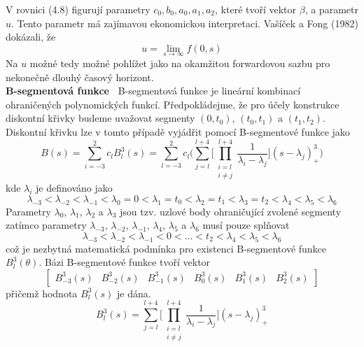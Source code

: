 \documentclass[a4paper]{book}
\begin{document}
V rovnici (4.8) figurují parametry $c_0, b_0, a_0, a_1, a_2$, které tvoří vektor $\beta$, a parametr $u$. Tento parametr má zajímavou ekonomickou interpretaci. Vašíček a Fong (1982) dokázali, že
\begin{equation*}
u = \underset{s \rightarrow \infty}{\lim} f(0,s)
\end{equation*}
Na $u$ možné tedy možné pohlížet jako na okamžitou forwardovou sazbu pro nekonečně dlouhý časový horizont.\\

\noindent \textbf{B-segmentová funkce~} B-segmentová funkce je lineární kombinací ohraničených polynomických funkcí. Předpokládejme, že pro účely konstrukce diskontní křivky budeme uvažovat segmenty $(0, t_0)$, $(t_0, t_1)$ a $(t_1, t_2)$. Diskontní křivku lze v tomto případě vyjádřit pomocí B-segmentové funkce jako
\begin{equation}
B(s) = \sum_{i = -3}^2 c_l B_l^3(s) = \sum_{l = -3}^2 c_l \Bigg( \sum_{j=l}^{l + 4} \Bigg[ \prod_{\substack{i=l \\ i \neq j}}^{l+4} \frac{1}{\lambda_i - \lambda_j}\Bigg](s - \lambda_j)_{+}^3\Bigg)
\end{equation}
kde $\lambda_i$ je definováno jako
\begin{equation*}
\lambda_{-3} < \lambda_{-2} < \lambda_{-1} < \lambda_0 = 0 < \lambda_1 = t_0 < \lambda_2 = t_1 < \lambda_3 = t_2 < \lambda_4 < \lambda_5 < \lambda_6
\end{equation*}
Parametry $\lambda_0$, $\lambda_1$, $\lambda_2$ a $\lambda_3$ jsou tzv. uzlové body ohraničující zvolené segmenty zatímco parametry $\lambda_{-3}$, $\lambda_{-2}$, $\lambda_{-1}$, $\lambda_4$, $\lambda_5$ a $\lambda_6$ musí pouze splňovat
\begin{equation*}
\lambda_{-3} < \lambda_{-2} < \lambda_{-1} < 0 < \dots < t_2 < \lambda_4 < \lambda_5 < \lambda_6
\end{equation*}
což je nezbytná matematická podmínka pro existenci B-segmentové funkce $B_l^3(\theta)$. Bázi B-segmentové funkce tvoří vektor
\begin{equation*}
\begin{bmatrix}
B_{-3}^3(s) & B_{-2}^3(s) & B_{-1}^3(s) & B_{0}^3(s) & B_{1}^3(s) & B_{2}^3(s)
\end{bmatrix}
\end{equation*}
přičemž hodnota $B_l^3(s)$ je dána.
\begin{equation*}
B_l^3(s) = \sum_{j=l}^{l + 4} \Bigg[ \prod_{\substack{i=l \\ i \neq j}}^{l+4} \frac{1}{\lambda_i - \lambda_j}\Bigg](s - \lambda_j)_{+}^3
\end{equation*}
\end{document}
